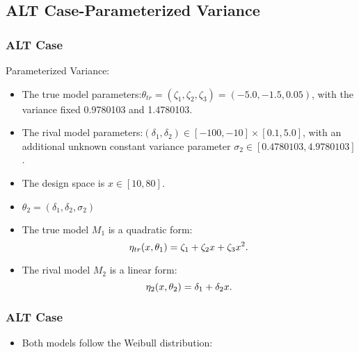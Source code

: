 \documentclass[xcolor=dvipsnames,aspectratio=1610]{beamer}
\begin{document}
\subsection{ALT Case-Parameterized Variance}
\begin{frame}
\frametitle{ALT Case}
Parameterized Variance:
\begin{itemize}
\item The true model parameters:$\theta_{tr} = (\zeta_1, \zeta_2, \zeta_3) = (-5.0, -1.5, 0.05)$, with the variance fixed 0.9780103 and 1.4780103.
\item The rival model parameters:$(\delta_1, \delta_2) \in [-100, -10] \times [0.1, 5.0]$, with an additional unknown constant variance parameter $\sigma_2 \in [0.4780103, 4.9780103]$.
\item The design space is $x \in [10, 80]$.
\item $\theta_2=(\delta_1,\delta_2,\sigma_2)$

\item The true model $M_1$ is a quadratic form:
\begin{equation} \notag 
\eta_{tr}(x,\theta_1)=\zeta_1+\zeta_2x+\zeta_3x^2.
\end{equation}

\item The rival model $M_2$ is a linear form: 
\begin{equation} \notag
\eta_{2}(x,\theta_2)=\delta_1+\delta_2x.
\end{equation}
\end{itemize}

\end{frame}




\begin{frame}
\frametitle{ALT Case}
\begin{itemize}
\item Both models follow the Weibull distribution:
\end{itemize}

\begin{figure}
\end{figure}

\end{frame}
\end{document}
